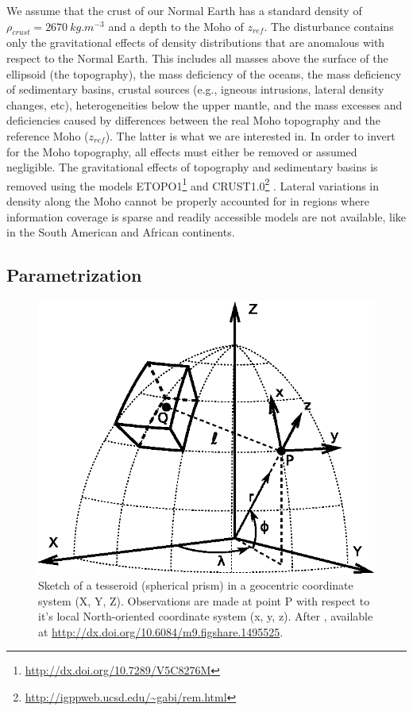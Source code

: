 \documentclass[extra]{gji}
\begin{document}
We assume that the crust of our Normal Earth has a standard density of
$\rho_{crust} = 2670\ kg.m^{-3}$ and a depth to the Moho of $z_{ref}$.
The disturbance contains only the gravitational effects of density
distributions that are anomalous with respect to the Normal Earth.
This includes all masses above the surface of the ellipsoid (the topography),
the mass deficiency of the oceans,
the mass deficiency of sedimentary basins,
crustal sources (e.g., igneous intrusions, lateral density changes, etc),
heterogeneities below the upper mantle,
and
the mass excesses and deficiencies caused by differences between the real Moho
topography and the reference Moho ($z_{ref}$).
The latter is what we are interested in.
In order to invert for the Moho topography, all effects must either be removed
or assumed negligible.
The gravitational effects of topography and sedimentary basins is
removed using the models
ETOPO1\footnote{\url{http://dx.doi.org/10.7289/V5C8276M}}
\citep{amante_c._and_b._w._eakins_etopo1_2009}
and CRUST1.0\footnote{\url{http://igppweb.ucsd.edu/~gabi/rem.html}}
\citep{laske_update_2013}.
Lateral variations in density along the Moho cannot be properly accounted for
in regions where information coverage is sparse and readily accessible models
are not available, like in the South American and African continents.


\subsection{Parametrization}

\begin{figure}
    \centering
    \includegraphics[width=\columnwidth]{figures/paper/tesseroid-coord-sys}
    \caption{Sketch of a tesseroid (spherical prism) in a geocentric coordinate
        system (X, Y, Z).
        Observations are made at point P with respect to it's local
        North-oriented coordinate system (x, y, z).
        After \citet{uieda_tesserioid_2015},
        available at
        \url{http://dx.doi.org/10.6084/m9.figshare.1495525}.
    }
    \label{fig:tess}
\end{figure}
\end{document}
